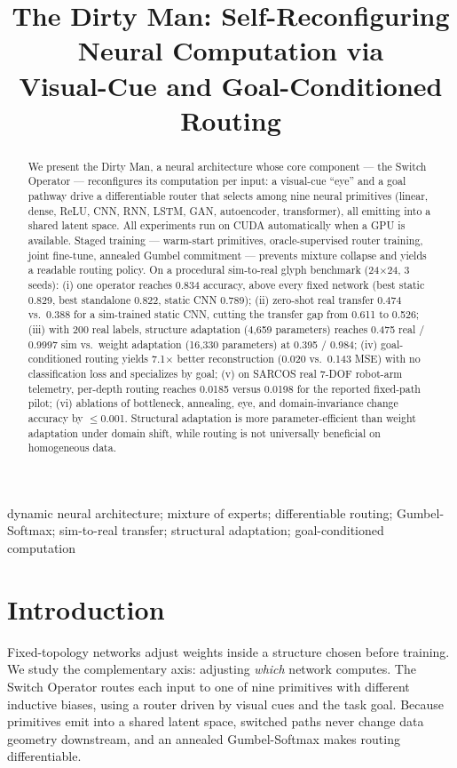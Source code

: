 \documentclass[conference,10pt]{IEEEtran}
\title{The Dirty Man: Self-Reconfiguring Neural Computation via\\Visual-Cue and Goal-Conditioned Routing}
\author{\IEEEauthorblockN{Sehaj Singh}
\IEEEauthorblockA{\textit{Independent Research}\\
2026, \url{sehaj@example.com}}}
\begin{document}
\maketitle

\begin{abstract}
We present the Dirty Man, a neural architecture whose core component --- the Switch Operator --- reconfigures its computation per input: a visual-cue ``eye'' and a goal pathway drive a differentiable router that selects among nine neural primitives (linear, dense, ReLU, CNN, RNN, LSTM, GAN, autoencoder, transformer), all emitting into a shared latent space. All experiments run on CUDA automatically when a GPU is available. Staged training --- warm-start primitives, oracle-supervised router training, joint fine-tune, annealed Gumbel commitment --- prevents mixture collapse and yields a readable routing policy. On a procedural sim-to-real glyph benchmark (24$\times$24, 3 seeds): (i) one operator reaches 0.834 accuracy, above every fixed network (best static 0.829, best standalone 0.822, static CNN 0.789); (ii) zero-shot real transfer 0.474 vs.\ 0.388 for a sim-trained static CNN, cutting the transfer gap from 0.611 to 0.526; (iii) with 200 real labels, structure adaptation (4{,}659 parameters) reaches 0.475 real / 0.9997 sim vs.\ weight adaptation (16{,}330 parameters) at 0.395 / 0.984; (iv) goal-conditioned routing yields 7.1$\times$ better reconstruction (0.020 vs.\ 0.143 MSE) with no classification loss and specializes by goal; (v) on SARCOS real 7-DOF robot-arm telemetry, per-depth routing reaches 0.0185 versus 0.0198 for the reported fixed-path pilot; (vi) ablations of bottleneck, annealing, eye, and domain-invariance change accuracy by $\le$0.001. Structural adaptation is more parameter-efficient than weight adaptation under domain shift, while routing is not universally beneficial on homogeneous data.
\end{abstract}

\begin{IEEEkeywords}
dynamic neural architecture; mixture of experts; differentiable routing; Gumbel-Softmax; sim-to-real transfer; structural adaptation; goal-conditioned computation
\end{IEEEkeywords}

\section{Introduction}
Fixed-topology networks adjust weights inside a structure chosen before training. We study the complementary axis: adjusting \emph{which} network computes. The Switch Operator routes each input to one of nine primitives with different inductive biases, using a router driven by visual cues and the task goal. Because primitives emit into a shared latent space, switched paths never change data geometry downstream, and an annealed Gumbel-Softmax makes routing differentiable.
\end{document}
